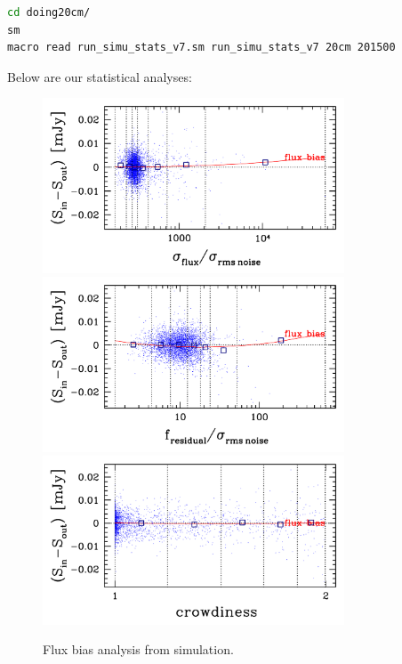\documentclass[11pt,a4paper]{article}
\begin{document}
\begin{lstlisting}[language=bash]
cd doing20cm/
sm
macro read run_simu_stats_v7.sm run_simu_stats_v7 20cm 201500
\end{lstlisting}

Below are our statistical analyses:

\begin{figure}[H]
	\includegraphics[width=0.8\textwidth]{galsim_20cm_fbias_1}
	\includegraphics[width=0.8\textwidth]{galsim_20cm_fbias_2}
	\includegraphics[width=0.8\textwidth]{galsim_20cm_fbias_3}
	\caption{Flux bias analysis from simulation.}
\end{figure}
\end{document}
